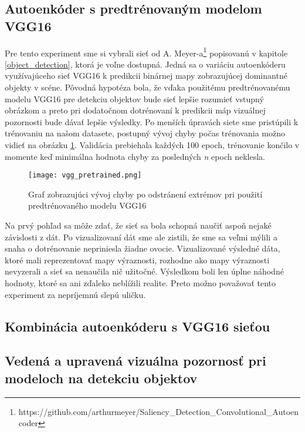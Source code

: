 \subsection{Autoenkóder s predtrénovaným modelom VGG16}
\label{experiments_vgg_net}

Pre tento experiment sme si vybrali sieť od A. Meyer-a\footnote{https://github.com/arthurmeyer/Saliency\_Detection\_Convolutional\_Autoencoder} popisovanú v kapitole \ref{object_detection}, ktorá je voľne dostupná. Jedná sa o variáciu autoenkóderu využívajúceho sieť VGG16 k predikcii binárnej mapy zobrazujúcej dominantné objekty v scéne. Pôvodná hypotéza bola, že vďaka použitému predtrénovanému modelu VGG16 pre detekciu objektov bude sieť lepšie rozumieť vstupný obrázkom a preto pri dodatočnom dotrénovaní k predikcii máp vizuálnej pozornosti bude dávať lepšie výsledky. Po menších úpravách siete sme pristúpili k trénovaniu na našom datasete, postupný vývoj chyby počas trénovania možno vidieť na obrázku \ref{vgg_pretrained_loss}. Validácia prebiehala každých 100 epoch, trénovanie končilo v momente keď minimálna hodnota chyby za posledných \textit{n} epoch neklesla. 
 
\begin{figure}[H]
	\begin{center}
		\texttt{[image: vgg\_pretrained.png]}
		\caption[Vývoj chyby počas trénovanie siete s predtrénovaným modelom VGG16]{
			Graf zobrazujúci vývoj chyby po odstránení extrémov pri použití predtrénovaného modelu VGG16 
		}\label{vgg_pretrained_loss}
	\end{center}
\end{figure}

Na prvý pohľad sa môže zdať, že sieť sa bola schopná naučiť aspoň nejaké závislosti z dát. Po vizualizovaní dát sme ale zistili, že sme sa veľmi mýlili a snaha o dotrénovanie nepriniesla žiadne ovocie. Vizualizované výsledné dáta, ktoré mali reprezentovať mapy výraznosti, rozhodne ako mapy výraznosti nevyzerali a sieť sa nenaučila nič užitočné. Výsledkom boli len úplne náhodné hodnoty, ktoré sa ani zďaleko neblížili realite. Preto možno považovať tento experiment za nepríjemnú slepú uličku.

\subsection{Kombinácia autoenkóderu s VGG16 sieťou}


\subsection{Vedená a upravená vizuálna pozornosť pri modeloch na detekciu objektov}

